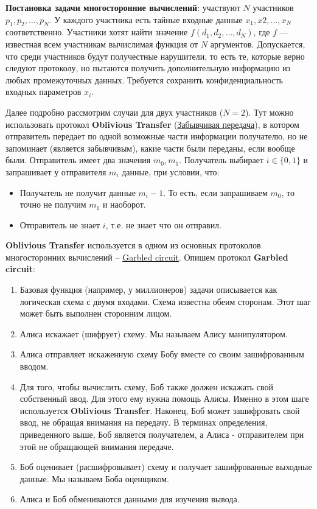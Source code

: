 \textbf{Постановка задачи многосторонние вычислений}: участвуют $N$ участников $p_1, p_2, \dots, p_N$. У каждого участника есть тайные входные данные $x_1, x2, \dots, x_N$ соответственно. Участники хотят найти значение $f(d_1, d_2, \dots, d_N)$, где $f$ — известная всем участникам вычислимая функция от $N$ аргументов. Допускается, что среди участников будут получестные нарушители, то есть те, которые верно следуют протоколу, но пытаются получить дополнительную информацию из любых промежуточных данных. Требуется сохранить конфиденциальность входных параметров $x_i$. 

Далее подробно рассмотрим случаи для двух участников ($N=2$).
Тут можно использовать протокол \textbf{Oblivious Transfer} (\href{https://clck.ru/puQ3n}{Забывчивая передача}), в котором отправитель передает по одной возможные части информации получателю, но не запоминает (является забывчивым), какие части были переданы, если вообще были. Отправитель имеет два значения $m_0, m_1$. Получатель выбирает $i \in \{0,1 \}$ и запрашивает у отправителя $m_i$ данные, при условии, что:
\begin{itemize}
	\item Получатель не получит данные $m_i-1$. То есть, если запрашиваем $m_0$, то точно не получим $m_1$ и наоборот.
	\item Отправитель не знает $i$, т.е. не знает что он отправил. 
\end{itemize}

\textbf{Oblivious Transfer} используется в одном из основных протоколов многосторонних вычислений -- \href{https://ru.wikibrief.org/wiki/Garbled_circuit}{Garbled circuit}. Опишем протокол \textbf{Garbled circuit}:
\begin{enumerate}
	\item Базовая функция (например, у миллионеров) задачи описывается как логическая схема с двумя входами. Схема известна обеим сторонам. Этот шаг может быть выполнен сторонним лицом.
	\item Алиса искажает (шифрует) схему. Мы называем Алису манипулятором.
	\item Алиса отправляет искаженную схему Бобу вместе со своим зашифрованным вводом.
	\item Для того, чтобы вычислить схему, Боб также должен искажать свой собственный ввод. Для этого ему нужна помощь Алисы. Именно в этом шаге используется \textbf{Oblivious Transfer}. Наконец, Боб может зашифровать свой ввод, не обращая внимания на передачу. В терминах определения, приведенного выше, Боб является получателем, а Алиса - отправителем при этой не обращающей внимания передаче.
	\item Боб оценивает (расшифровывает) схему и получает зашифрованные выходные данные. Мы называем Боба оценщиком.
	\item Алиса и Боб обмениваются данными для изучения вывода.
\end{enumerate}

